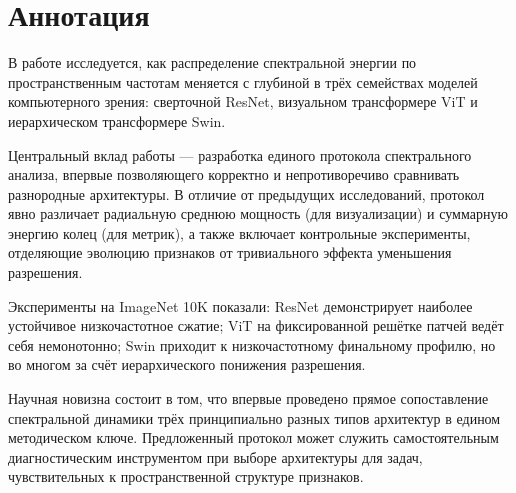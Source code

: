 \chapter*{Аннотация}
В работе исследуется, как распределение спектральной энергии по пространственным частотам меняется с глубиной в трёх семействах моделей компьютерного зрения: сверточной ResNet, визуальном трансформере ViT и иерархическом трансформере Swin.

Центральный вклад работы — разработка единого протокола спектрального анализа, впервые позволяющего корректно и непротиворечиво сравнивать разнородные архитектуры. В отличие от предыдущих исследований, протокол явно различает радиальную среднюю мощность (для визуализации) и суммарную энергию колец (для метрик), а также включает контрольные эксперименты, отделяющие эволюцию признаков от тривиального эффекта уменьшения разрешения.

Эксперименты на ImageNet 10K показали: ResNet демонстрирует наиболее устойчивое низкочастотное сжатие; ViT на фиксированной решётке патчей ведёт себя немонотонно; Swin приходит к низкочастотному финальному профилю, но во многом за счёт иерархического понижения разрешения.

Научная новизна состоит в том, что впервые проведено прямое сопоставление спектральной динамики трёх принципиально разных типов архитектур в едином методическом ключе. Предложенный протокол может служить самостоятельным диагностическим инструментом при выборе архитектуры для задач, чувствительных к пространственной структуре признаков.
